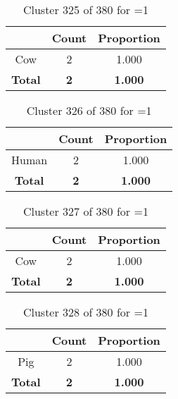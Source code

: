 \begin{table}[ht!]
\centering
\begin{tabular}{|c|c|c|}
\hline
\bf \Spec{} &\bf Count &\bf Proportion\\ \hline \hline
Cow & 2 & 1.000\\ \hline
\hline
\bf Total & \bf 2 & \bf 1.000\\ \hline
\end{tabular}
\label{tab:cluster:325:1}
\caption{Cluster 325 of 380 for \minneigh{}=1}
\end{table}

\begin{table}[ht!]
\centering
\begin{tabular}{|c|c|c|}
\hline
\bf \Spec{} &\bf Count &\bf Proportion\\ \hline \hline
Human & 2 & 1.000\\ \hline
\hline
\bf Total & \bf 2 & \bf 1.000\\ \hline
\end{tabular}
\label{tab:cluster:326:1}
\caption{Cluster 326 of 380 for \minneigh{}=1}
\end{table}

\begin{table}[ht!]
\centering
\begin{tabular}{|c|c|c|}
\hline
\bf \Spec{} &\bf Count &\bf Proportion\\ \hline \hline
Cow & 2 & 1.000\\ \hline
\hline
\bf Total & \bf 2 & \bf 1.000\\ \hline
\end{tabular}
\label{tab:cluster:327:1}
\caption{Cluster 327 of 380 for \minneigh{}=1}
\end{table}

\begin{table}[ht!]
\centering
\begin{tabular}{|c|c|c|}
\hline
\bf \Spec{} &\bf Count &\bf Proportion\\ \hline \hline
Pig & 2 & 1.000\\ \hline
\hline
\bf Total & \bf 2 & \bf 1.000\\ \hline
\end{tabular}
\label{tab:cluster:328:1}
\caption{Cluster 328 of 380 for \minneigh{}=1}
\end{table}

